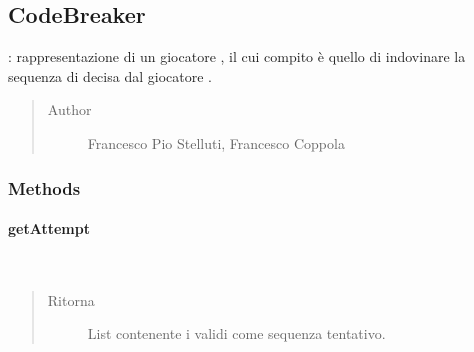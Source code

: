 \documentclass[letterpaper,10pt,italian,openany,oneside]{sphinxmanual}
\begin{document}
\subsection{CodeBreaker}
\label{\detokenize{source/it/unicam/cs/pa/mastermind/players/CodeBreaker:codebreaker}}\label{\detokenize{source/it/unicam/cs/pa/mastermind/players/CodeBreaker::doc}}

\begin{fulllineitems}
\label{\detokenize{source/it/unicam/cs/pa/mastermind/players/CodeBreaker:it.unicam.cs.pa.mastermind.players.CodeBreaker}}
: rappresentazione di un giocatore , il cui compito è quello di indovinare la sequenza di  decisa dal giocatore .
\begin{quote}\begin{description}
\item[{Author}] \leavevmode
Francesco Pio Stelluti, Francesco Coppola

\end{description}\end{quote}

\end{fulllineitems}



\subsubsection{Methods}
\label{\detokenize{source/it/unicam/cs/pa/mastermind/players/CodeBreaker:methods}}

\paragraph{getAttempt}
\label{\detokenize{source/it/unicam/cs/pa/mastermind/players/CodeBreaker:getattempt}}

\begin{fulllineitems}
\label{\detokenize{source/it/unicam/cs/pa/mastermind/players/CodeBreaker:it.unicam.cs.pa.mastermind.players.CodeBreaker.getAttempt()}}~\begin{quote}\begin{description}
\item[{Ritorna}] \leavevmode
List contenente i  validi come sequenza tentativo.

\end{description}\end{quote}

\end{fulllineitems}
\end{document}
